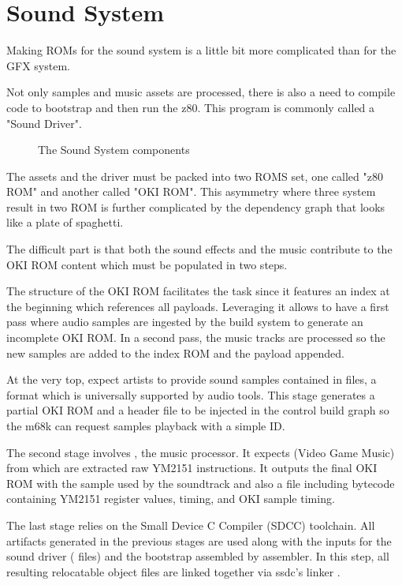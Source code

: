 \chapter{Sound System}
Making ROMs for the sound system is a little bit more complicated than for the GFX system. 

Not only samples and music assets are processed, there is also a need to compile code to bootstrap and then run the z80. This program is commonly called a "Sound Driver".

\begin{figure}[H]
\caption*{The Sound System components}
\end{figure}

The assets and the driver must be packed into two ROMS set, one called "z80 ROM" and another called "OKI ROM". This asymmetry where three system result in two ROM is further complicated by the dependency graph that looks like a plate of spaghetti. 

The difficult part is that both the sound effects and the music contribute to the OKI ROM content which must be populated in two steps.




The structure of the OKI ROM facilitates the task since it features an index at the beginning which references all payloads. Leveraging it allows to have a first pass where audio samples are ingested by the build system to generate an incomplete OKI ROM. In a second pass, the music tracks are processed so the new samples are added to the index ROM and the payload appended.

At the very top,  expect artists to provide sound samples contained in  files, a format which is universally supported by audio tools. This stage generates a partial OKI ROM and a  header file to be injected in the control build graph so the m68k can request samples playback with a simple ID.

The second stage involves , the music processor. It expects  (Video Game Music) from which are extracted raw YM2151 instructions. It outputs the final OKI ROM with the sample used by the soundtrack and also a  file including bytecode containing YM2151 register values, timing, and OKI sample timing.

The last stage relies on the Small Device C Compiler (SDCC) toolchain. All artifacts generated in the previous stages are used along with the inputs for the sound driver ( files) and the bootstrap  assembled by  assembler. In this step, all resulting relocatable object files  are linked together via ssdc's linker . 






